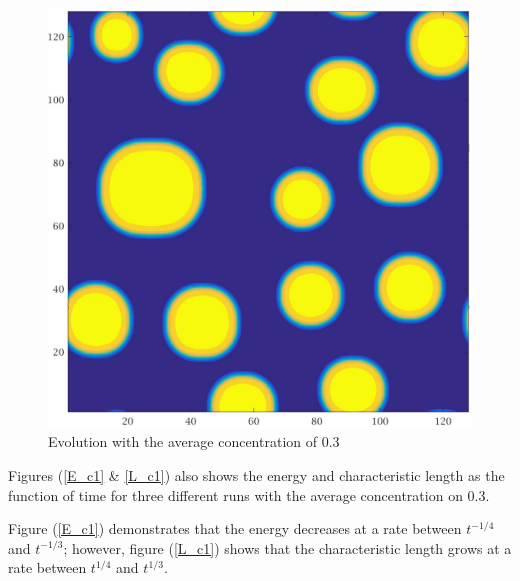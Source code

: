 \documentclass[a4paper,6pt]{article}
\begin{document}
\begin{figure}[H]
\begin{minipage}[b]{.32\linewidth}
        \end{minipage}
                \begin{minipage}[b]{.32\linewidth}
                \centering
                \includegraphics[width=1\textwidth]{pics/C1_t6.jpg}
        \end{minipage}
        \caption{Evolution with the average concentration of 0.3}
        \label{evolution_c1}
\end{figure}

Figures (\ref{E_c1} \& \ref{L_c1}) also shows the energy and characteristic length as the function of time for three different runs with the average concentration on 0.3.

Figure (\ref{E_c1}) demonstrates that the energy decreases at a rate between $t^{-1/4}$ and $t^{-1/3}$; however, figure (\ref{L_c1}) shows that the characteristic length grows at a rate between $t^{1/4}$ and $t^{1/3}$.
\end{document}
